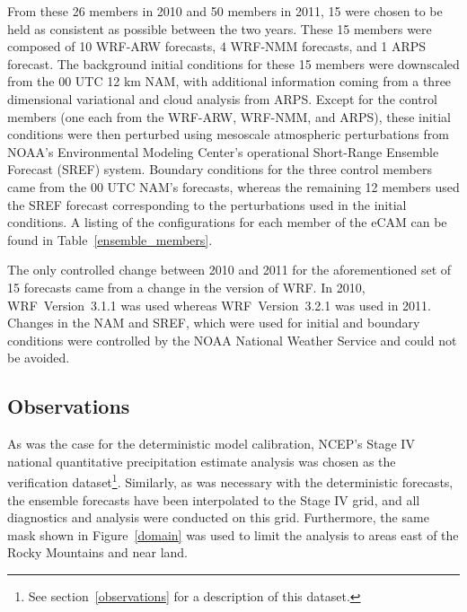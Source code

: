 From these 26 members in 2010 and 50 members in 2011, 15 were chosen to be held as consistent as possible between the two years.
These 15 members were composed of 10 WRF-ARW forecasts, 4 WRF-NMM forecasts, and 1 ARPS forecast.
The background initial conditions for these 15 members were downscaled from the 00 UTC 12 km NAM, with additional information coming from a three dimensional variational and cloud analysis from ARPS.
Except for the control members (one each from the WRF-ARW, WRF-NMM, and ARPS), these initial conditions were then perturbed using mesoscale atmospheric perturbations from NOAA's Environmental Modeling Center's operational Short-Range Ensemble Forecast (SREF) system.
Boundary conditions for the three control members came from the 00 UTC NAM's forecasts, whereas the remaining 12 members used the SREF forecast corresponding to the perturbations used in the initial conditions. A listing of the configurations for each member of the eCAM can be found in \mbox{Table \ref{ensemble_members}}.


The only controlled change between 2010 and 2011 for the aforementioned set of 15 forecasts came from a change in the version of WRF. In 2010, \mbox{WRF Version 3.1.1} was used whereas \mbox{WRF Version 3.2.1} was used in 2011.
Changes in the NAM and SREF, which were used for initial and boundary conditions were controlled by the NOAA National Weather Service and could not be avoided.




\subsection{Observations}
\label{eobservations}

As was the case for the deterministic model calibration, NCEP's Stage IV national quantitative precipitation estimate analysis was chosen as the verification dataset\footnote{See \mbox{section \ref{observations}} for a description of this dataset.}.
Similarly, as was necessary with the deterministic forecasts, the ensemble forecasts have been interpolated to the Stage IV grid, and all diagnostics and analysis were conducted on this grid.
Furthermore, the same mask shown in \mbox{Figure \ref{domain}} was used to limit the analysis to areas east of the Rocky Mountains and near land.


